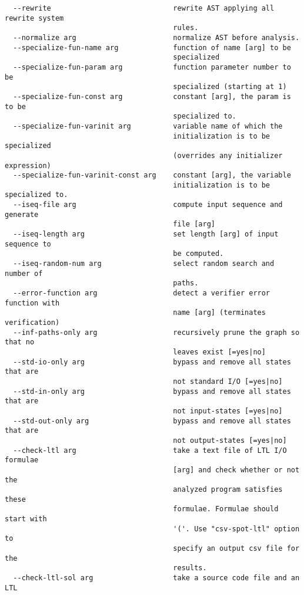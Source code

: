 \documentclass[natbib]{article}
\begin{document}
\begin{verbatim}
  --rewrite                             rewrite AST applying all rewrite system
                                        rules.
  --normalize arg                       normalize AST before analysis.
  --specialize-fun-name arg             function of name [arg] to be 
                                        specialized
  --specialize-fun-param arg            function parameter number to be 
                                        specialized (starting at 1)
  --specialize-fun-const arg            constant [arg], the param is to be 
                                        specialized to.
  --specialize-fun-varinit arg          variable name of which the 
                                        initialization is to be specialized 
                                        (overrides any initializer expression)
  --specialize-fun-varinit-const arg    constant [arg], the variable 
                                        initialization is to be specialized to.
  --iseq-file arg                       compute input sequence and generate 
                                        file [arg]
  --iseq-length arg                     set length [arg] of input sequence to 
                                        be computed.
  --iseq-random-num arg                 select random search and number of 
                                        paths.
  --error-function arg                  detect a verifier error function with 
                                        name [arg] (terminates verification)
  --inf-paths-only arg                  recursively prune the graph so that no 
                                        leaves exist [=yes|no]
  --std-io-only arg                     bypass and remove all states that are 
                                        not standard I/O [=yes|no]
  --std-in-only arg                     bypass and remove all states that are 
                                        not input-states [=yes|no]
  --std-out-only arg                    bypass and remove all states that are 
                                        not output-states [=yes|no]
  --check-ltl arg                       take a text file of LTL I/O formulae 
                                        [arg] and check whether or not the 
                                        analyzed program satisfies these 
                                        formulae. Formulae should start with 
                                        '('. Use "csv-spot-ltl" option to 
                                        specify an output csv file for the 
                                        results.
  --check-ltl-sol arg                   take a source code file and an LTL 

\end{verbatim}
\end{document}

